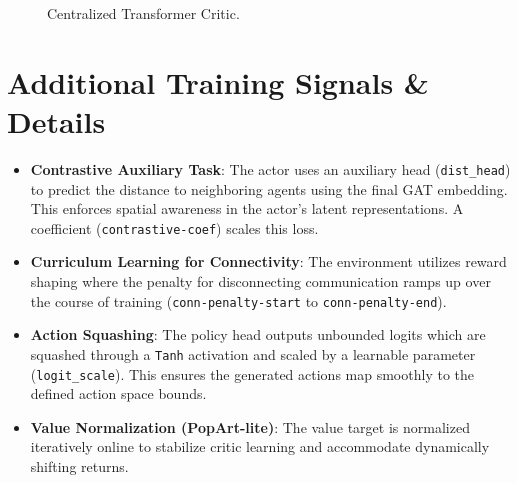 \documentclass[11pt, a4paper]{article}
\begin{document}
\begin{figure}[h]
\caption{Centralized Transformer Critic.}
\end{figure}

\section{Additional Training Signals \& Details}
\begin{itemize}
    \item \textbf{Contrastive Auxiliary Task}: The actor uses an auxiliary head (\texttt{dist\_head}) to predict the distance to neighboring agents using the final GAT embedding. This enforces spatial awareness in the actor's latent representations. A coefficient (\texttt{contrastive-coef}) scales this loss.
    \item \textbf{Curriculum Learning for Connectivity}: The environment utilizes reward shaping where the penalty for disconnecting communication ramps up over the course of training (\texttt{conn-penalty-start} to \texttt{conn-penalty-end}).
    \item \textbf{Action Squashing}: The policy head outputs unbounded logits which are squashed through a \texttt{Tanh} activation and scaled by a learnable parameter (\texttt{logit\_scale}). This ensures the generated actions map smoothly to the defined action space bounds.
    \item \textbf{Value Normalization (PopArt-lite)}: The value target is normalized iteratively online to stabilize critic learning and accommodate dynamically shifting returns.
\end{itemize}
\end{document}
